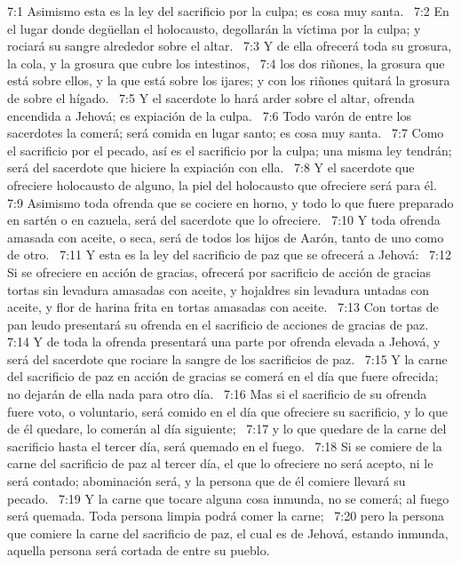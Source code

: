 7:1 Asimismo esta es la ley del sacrificio por la culpa; es cosa muy santa.  
7:2 En el lugar donde degüellan el holocausto, degollarán la víctima por la culpa; y rociará su sangre alrededor sobre el altar.  
7:3 Y de ella ofrecerá toda su grosura, la cola, y la grosura que cubre los intestinos,  
7:4 los dos riñones, la grosura que está sobre ellos, y la que está sobre los ijares; y con los riñones quitará la grosura de sobre el hígado.  
7:5 Y el sacerdote lo hará arder sobre el altar, ofrenda encendida a Jehová; es expiación de la culpa.  
7:6 Todo varón de entre los sacerdotes la comerá; será comida en lugar santo; es cosa muy santa.  
7:7 Como el sacrificio por el pecado, así es el sacrificio por la culpa; una misma ley tendrán; será del sacerdote que hiciere la expiación con ella.  
7:8 Y el sacerdote que ofreciere holocausto de alguno, la piel del holocausto que ofreciere será para él.  
7:9 Asimismo toda ofrenda que se cociere en horno, y todo lo que fuere preparado en sartén o en cazuela, será del sacerdote que lo ofreciere.  
7:10 Y toda ofrenda amasada con aceite, o seca, será de todos los hijos de Aarón, tanto de uno como de otro.  
7:11 Y esta es la ley del sacrificio de paz que se ofrecerá a Jehová:  
7:12 Si se ofreciere en acción de gracias, ofrecerá por sacrificio de acción de gracias tortas sin levadura amasadas con aceite, y hojaldres sin levadura untadas con aceite, y flor de harina frita en tortas amasadas con aceite.  
7:13 Con tortas de pan leudo presentará su ofrenda en el sacrificio de acciones de gracias de paz.  
7:14 Y de toda la ofrenda presentará una parte por ofrenda elevada a Jehová, y será del sacerdote que rociare la sangre de los sacrificios de paz.  
7:15 Y la carne del sacrificio de paz en acción de gracias se comerá en el día que fuere ofrecida; no dejarán de ella nada para otro día.  
7:16 Mas si el sacrificio de su ofrenda fuere voto, o voluntario, será comido en el día que ofreciere su sacrificio, y lo que de él quedare, lo comerán al día siguiente;  
7:17 y lo que quedare de la carne del sacrificio hasta el tercer día, será quemado en el fuego.  
7:18 Si se comiere de la carne del sacrificio de paz al tercer día, el que lo ofreciere no será acepto, ni le será contado; abominación será, y la persona que de él comiere llevará su pecado.  
7:19 Y la carne que tocare alguna cosa inmunda, no se comerá; al fuego será quemada. Toda persona limpia podrá comer la carne;  
7:20 pero la persona que comiere la carne del sacrificio de paz, el cual es de Jehová, estando inmunda, aquella persona será cortada de entre su pueblo.  
